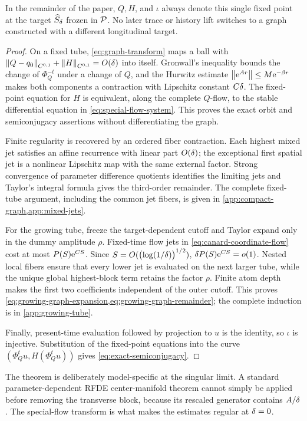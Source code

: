 In the remainder of the paper, \(Q,H\), and \(\iota\) always denote this
single fixed point at the target \(\widehat S_\delta\) frozen in \(\mathcal P\).
No later trace or history lift switches to a graph constructed with a
different longitudinal target.

\begin{proof}
On a fixed tube, \cref{eq:graph-transform} maps a ball with
\(\left\lVert Q-q_0\right\rVert_{C^{0,1}}+\left\lVert H\right\rVert_{C^{0,1}}=O(\delta)\) into itself.
Gronwall's inequality bounds the change of \(\Phi_Q^{-t}\) under a change of
\(Q\), and the Hurwitz estimate
\(\left\lVert \mathrm e^{Ar}\right\rVert\le M\mathrm e^{-\beta r}\) makes both components a contraction
with Lipschitz constant \(C\delta\).  The fixed-point equation for \(H\) is
equivalent, along the complete \(Q\)-flow, to the stable differential
equation in \cref{eq:special-flow-system}.  This proves the exact orbit and
semiconjugacy assertions without differentiating the graph.

Finite regularity is recovered by an ordered fiber contraction.  Each
highest mixed jet satisfies an affine recurrence with linear part
\(O(\delta)\); the exceptional first spatial jet is a nonlinear Lipschitz map
with the same external factor.  Strong convergence of parameter difference
quotients identifies the limiting jets and Taylor's integral formula gives
the third-order remainder.  The complete fixed-tube argument, including the
common jet fibers, is given in \cref{app:compact-graph,app:mixed-jets}.

For the growing tube, freeze the target-dependent cutoff and Taylor expand
only in the dummy amplitude \(\rho\).  Fixed-time flow jets in
\cref{eq:canard-coordinate-flow} cost at most
\(P(S)\mathrm e^{CS}\).  Since \(S=O(\bigl(\log(1/\delta)\bigr)^{1/2})\),
\(\delta P(S)\mathrm e^{CS}=o(1)\).  Nested local fibers ensure that every lower
jet is evaluated on the next larger tube, while the unique global
highest-block term retains the factor \(\rho\).  Finite atom depth makes
the first two coefficients independent of the outer cutoff.  This proves
\cref{eq:growing-graph-expansion,eq:growing-graph-remainder}; the complete
induction is in \cref{app:growing-tube}.

Finally, present-time evaluation followed by projection to \(u\) is the
identity, so \(\iota\) is injective.  Substitution of the fixed-point
equations into the curve
\((\Phi_Q^tu,H(\Phi_Q^tu))\) gives
\cref{eq:exact-semiconjugacy}.
\end{proof}

The theorem is deliberately model-specific at the singular limit.  A
standard parameter-dependent RFDE center-manifold theorem cannot simply be
applied before removing the transverse block, because its rescaled
generator contains \(A/\delta\).  The special-flow transform is what makes
the estimates regular at \(\delta=0\).
